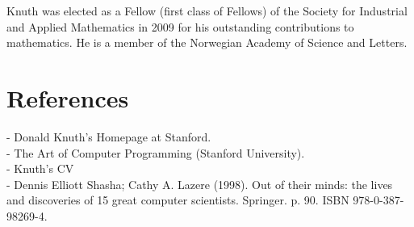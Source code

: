 \documentclass[10pt,letterpaper]{article}
\begin{document}
Knuth was elected as a Fellow (first class of Fellows) of the Society 
for Industrial and Applied Mathematics in 2009 for his outstanding 
contributions to mathematics. He is a member of the Norwegian 
Academy of Science and Letters.

\section{References}
- Donald Knuth's Homepage at Stanford.\\
-  The Art of Computer Programming (Stanford University).\\
- Knuth's CV\\
- Dennis Elliott Shasha; Cathy A. Lazere (1998). Out of their minds: the lives and discoveries of 15 great computer scientists. Springer. p. 90. ISBN 978-0-387-98269-4.
\end{document}
